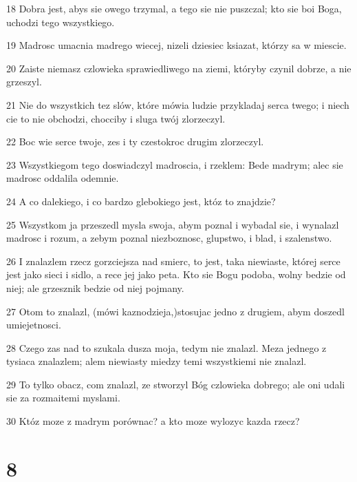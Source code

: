 \par 18 Dobra jest, abys sie owego trzymal, a tego sie nie puszczal; kto sie boi Boga, uchodzi tego wszystkiego.
\par 19 Madrosc umacnia madrego wiecej, nizeli dziesiec ksiazat, którzy sa w miescie.
\par 20 Zaiste niemasz czlowieka sprawiedliwego na ziemi, któryby czynil dobrze, a nie grzeszyl.
\par 21 Nie do wszystkich tez slów, które mówia ludzie przykladaj serca twego; i niech cie to nie obchodzi, chocciby i sluga twój zlorzeczyl.
\par 22 Boc wie serce twoje, zes i ty czestokroc drugim zlorzeczyl.
\par 23 Wszystkiegom tego doswiadczyl madroscia, i rzeklem: Bede madrym; alec sie madrosc oddalila odemnie.
\par 24 A co dalekiego, i co bardzo glebokiego jest, któz to znajdzie?
\par 25 Wszystkom ja przeszedl mysla swoja, abym poznal i wybadal sie, i wynalazl madrosc i rozum, a zebym poznal niezboznosc, glupstwo, i blad, i szalenstwo.
\par 26 I znalazlem rzecz gorzciejsza nad smierc, to jest, taka niewiaste, której serce jest jako sieci i sidlo, a rece jej jako peta. Kto sie Bogu podoba, wolny bedzie od niej; ale grzesznik bedzie od niej pojmany.
\par 27 Otom to znalazl, (mówi kaznodzieja,)stosujac jedno z drugiem, abym doszedl umiejetnosci.
\par 28 Czego zas nad to szukala dusza moja, tedym nie znalazl. Meza jednego z tysiaca znalazlem; alem niewiasty miedzy temi wszystkiemi nie znalazl.
\par 29 To tylko obacz, com znalazl, ze stworzyl Bóg czlowieka dobrego; ale oni udali sie za rozmaitemi myslami.
\par 30 Któz moze z madrym porównac? a kto moze wylozyc kazda rzecz?

\chapter{8}

